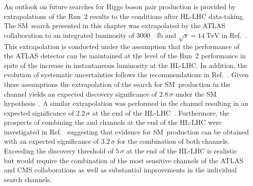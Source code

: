 An outlook on future searches for Higgs boson pair production is provided by
extrapolations of the Run~2 results to the conditions after HL-LHC
data-taking. The SM~\HH search presented in this chapter was extrapolated by the
ATLAS collaboration to an integrated luminosity of \SI{3000}{\per\femto\barn}
and $\sqrt{s} = \SI{14}{\TeV}$ in Ref.~\cite{ATL-PHYS-PUB-2021-044}. This
extrapolation is conducted under the assumption that the performance of the
ATLAS detector can be maintained at the level of the Run~2 performance in spite
of the increase in instantaneous luminosity at the HL-LHC. In addition, the
evolution of systematic uncertainties follows the recommendations in
Ref.~\cite{ATL-PHYS-PUB-2019-005}. Given these assumptions the extrapolation of
the search for SM~\HH production in the \bbtautau channel yields an expected
discovery significance of $2.8\,\sigma$ under the SM
hypothesis~\cite{ATL-PHYS-PUB-2021-044}.
A similar extrapolation was performed in the \bbyy channel resulting in an
expected significance of $2.2\,\sigma$ at the end of the
HL-LHC~\cite{ATL-PHYS-PUB-2022-001}. Furthermore, the prospects of combining the
\bbtautau and \bbyy channels at the end of the HL-LHC were investigated in
Ref.~\cite{ATL-PHYS-PUB-2022-005} suggesting that evidence for SM~\HH production
can be obtained with an expected significance of $3.2\,\sigma$ for the
combination of both channels. Exceeding the discovery threshold of $5\,\sigma$
at the end of the HL-LHC is realistic but would require the combination of the
most sensitive channels of the ATLAS and CMS collaborations as well as
substantial improvements in the individual search channels.


